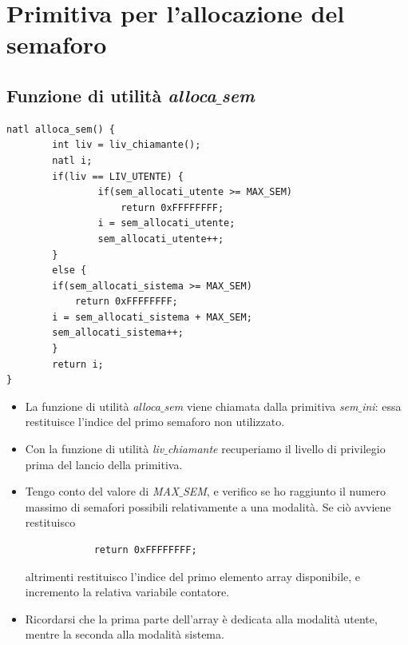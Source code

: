 \documentclass[11pt]{report}
\theoremstyle{definition}
\begin{document}
\section{Primitiva per l'allocazione del semaforo}
\subsection{Funzione di utilità \emph{alloca$\_$sem}}
\small 
\begin{verbatim}
natl alloca_sem() {
	    int liv = liv_chiamante();
	    natl i;
	    if(liv == LIV_UTENTE) {
		        if(sem_allocati_utente >= MAX_SEM)
		            return 0xFFFFFFFF;
		        i = sem_allocati_utente;
		        sem_allocati_utente++;
	    }
	    else {
        if(sem_allocati_sistema >= MAX_SEM)
            return 0xFFFFFFFF;
        i = sem_allocati_sistema + MAX_SEM;
        sem_allocati_sistema++;
	    }
	    return i;
}
\end{verbatim}
\normalsize 
\begin{itemize}	
	\item La funzione di utilità \emph{alloca$\_$sem} viene chiamata dalla primitiva \emph{sem$\_$ini}: essa restituisce l'indice del primo semaforo non utilizzato.
	\item Con la funzione di utilità \emph{liv$\_$chiamante} recuperiamo il livello di privilegio prima del lancio della primitiva. 
	\item Tengo conto del valore di \emph{MAX$\_$SEM}, e verifico se ho raggiunto il numero massimo di semafori possibili relativamente a una modalità. Se ciò avviene restituisco
		\begin{verbatim}
			return 0xFFFFFFFF;
		\end{verbatim}
		altrimenti restituisco l'indice del primo elemento array disponibile, e incremento la relativa variabile contatore. 
		\item Ricordarsi che la prima parte dell'array è dedicata alla modalità utente, mentre la seconda alla modalità sistema.
\end{itemize}
\end{document}
